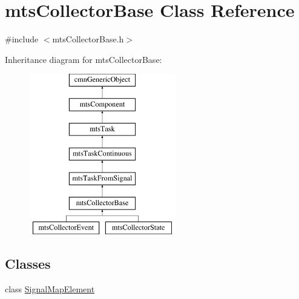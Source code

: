 \hypertarget{classmts_collector_base}{\section{mts\-Collector\-Base Class Reference}
\label{classmts_collector_base}
}


{\ttfamily \#include $<$mts\-Collector\-Base.\-h$>$}

Inheritance diagram for mts\-Collector\-Base\-:\begin{figure}[H]
\begin{center}
\leavevmode
\includegraphics[height=7.000000cm]{d9/d5d/classmts_collector_base}
\end{center}
\end{figure}
\subsection*{Classes}
\begin{DoxyCompactItemize}
\item 
class \hyperlink{classmts_collector_base_1_1_signal_map_element}{Signal\-Map\-Element}
\end{DoxyCompactItemize}
